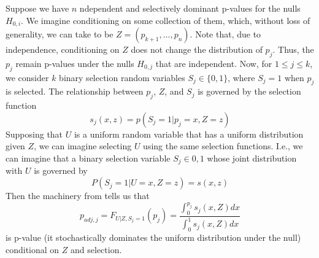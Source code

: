 \documentclass{article}
\begin{document}
\begin{appendix}
Suppose we have $n$ ndependent and selectively dominant p-values for the nulls $H_{0, i}$. We imagine conditioning on some collection of them, which, without loss of generality, we can take to be $Z = (p_{k+1}, \dots, p_n)$. Note that, due to independence, conditioning on $Z$ does not change the distribution of $p_j$. Thus, the $p_j$ remain p-values under the nulls $H_{0, j}$ that are independent. Now, for $1 \leq j \leq k$, we consider $k$ binary selection random variables $S_j \in \{0, 1\}$, where $S_j = 1$ when $p_j$ is selected. The relationship between $p_j$, $Z$, and $S_j$ is governed by the selection function 
\begin{equation*}
    s_j(x, z) = p(S_j = 1 | p_j = x, Z=z)
\end{equation*} 
Supposing that $U$ is a uniform random variable that has a uniform distribution given $Z$, we can imagine selecting $U$ using the same selection functions. I.e., we can imagine that a binary selection variable $S_j \in {0, 1}$ whose joint distribution with $U$ is governed by 
\begin{equation*}
    P(S_j = 1| U = x, Z = z) = s(x, z)
\end{equation*}
Then the machinery from  tells us that 
\begin{equation*}
    p_{adj, j} = F_{U |Z, S_j = 1}(p_j) = \frac{\int_0^{p_j} s_j(x, Z)dx }{\int_0^1 s_j(x, Z)dx}
\end{equation*}
is p-value (it stochastically dominates the uniform distribution under the null) conditional on $Z$ and selection. 


\end{appendix}
\end{document}
